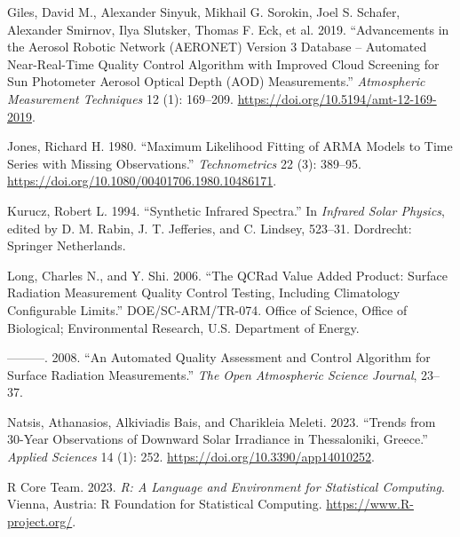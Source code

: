 \documentclass[
]{article}
\newlength{\cslhangindent}
\newlength{\cslentryspacingunit} %
\newenvironment{CSLReferences}[2] %
 {%
  \setlength{\parindent}{0pt}
  \ifodd #1
  \let\oldpar\par
  \def\par{\hangindent=\cslhangindent\oldpar}
  \fi
  \setlength{\parskip}{#2\cslentryspacingunit}
 }%
 {}
\begin{document}
\begin{CSLReferences}{1}{0}
\leavevmode{}%
Giles, David M., Alexander Sinyuk, Mikhail G. Sorokin, Joel S. Schafer, Alexander Smirnov, Ilya Slutsker, Thomas F. Eck, et al. 2019. {``Advancements in the Aerosol Robotic Network ({AERONET}) Version 3 Database -- Automated Near-Real-Time Quality Control Algorithm with Improved Cloud Screening for Sun Photometer Aerosol Optical Depth ({AOD}) Measurements.''} \emph{Atmospheric Measurement Techniques} 12 (1): 169--209. \url{https://doi.org/10.5194/amt-12-169-2019}.

\leavevmode{}%
Jones, Richard H. 1980. {``Maximum Likelihood Fitting of {ARMA} Models to Time Series with Missing Observations.''} \emph{Technometrics} 22 (3): 389--95. \url{https://doi.org/10.1080/00401706.1980.10486171}.

\leavevmode{}%
Kurucz, Robert L. 1994. {``Synthetic Infrared Spectra.''} In \emph{Infrared Solar Physics}, edited by D. M. Rabin, J. T. Jefferies, and C. Lindsey, 523--31. Dordrecht: Springer Netherlands.

\leavevmode{}%
Long, Charles N., and Y. Shi. 2006. {``The QCRad Value Added Product: Surface Radiation Measurement Quality Control Testing, Including Climatology Configurable Limits.''} DOE/SC-ARM/TR-074. Office of Science, Office of Biological; Environmental Research, U.S. Department of Energy.

\leavevmode{}%
---------. 2008. {``An Automated Quality Assessment and Control Algorithm for Surface Radiation Measurements.''} \emph{The Open Atmospheric Science Journal}, 23--37.

\leavevmode{}%
Natsis, Athanasios, Alkiviadis Bais, and Charikleia Meleti. 2023. {``Trends from 30-Year Observations of Downward Solar Irradiance in Thessaloniki, Greece.''} \emph{Applied Sciences} 14 (1): 252. \url{https://doi.org/10.3390/app14010252}.

\leavevmode{}%
R Core Team. 2023. \emph{R: A Language and Environment for Statistical Computing}. Vienna, Austria: R Foundation for Statistical Computing. \url{https://www.R-project.org/}.

\end{CSLReferences}
\end{document}
